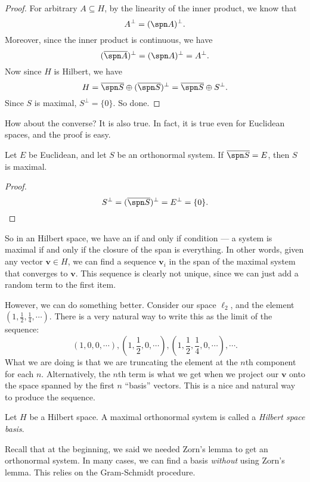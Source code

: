 \documentclass[a4paper]{article}
\begin{document}
\begin{proof}
  For arbitrary $A \subseteq H$, by the linearity of the inner product, we know that
  \[
    A^\perp = (\spn A)^\perp.
  \]
  Moreover, since the inner product is continuous, we have
  \[
    (\overline{\spn A})^\perp = (\spn A)^\perp = A^\perp.
  \]
  Now since $H$ is Hilbert, we have
  \[
    H = \overline{\spn S} \oplus (\overline{\spn S})^\perp = \overline{\spn S} \oplus S^\perp.
  \]
  Since $S$ is maximal, $S^\perp = \{0\}$. So done.
\end{proof}

How about the converse? It is also true. In fact, it is true even for Euclidean spaces, and the proof is easy.

\begin{prop}
  Let $E$ be Euclidean, and let $S$ be an orthonormal system. If $\overline{\spn S} = E$, then $S$ is maximal.
\end{prop}

\begin{proof}
  \[
    S^\perp = (\overline{\spn S})^\perp = E^\perp = \{0\}.
  \]
\end{proof}
So in an Hilbert space, we have an if and only if condition --- a system is maximal if and only if the closure of the span is everything. In other words, given any vector $\mathbf{v} \in H$, we can find a sequence $\mathbf{v}_i$ in the span of the maximal system that converges to $\mathbf{v}$. This sequence is clearly not unique, since we can just add a random term to the first item.

However, we can do something better. Consider our space $\ell_2$, and the element $(1, \frac{1}{2}, \frac{1}{4}, \cdots)$. There is a very natural way to write this as the limit of the sequence:
\[
  (1, 0, 0, \cdots), (1, \frac{1}{2}, 0, \cdots), (1, \frac{1}{2}, \frac{1}{4}, 0, \cdots), \cdots.
\]
What we are doing is that we are truncating the element at the $n$th component for each $n$. Alternatively, the $n$th term is what we get when we project our $\mathbf{v}$ onto the space spanned by the first $n$ ``basis'' vectors. This is a nice and natural way to produce the sequence.

\begin{defi}
  Let $H$ be a Hilbert space. A maximal orthonormal system is called a \emph{Hilbert space basis}.
\end{defi}

Recall that at the beginning, we said we needed Zorn's lemma to get an orthonormal system. In many cases, we can find a basis \emph{without} using Zorn's lemma. This relies on the Gram-Schmidt procedure.
\end{document}
